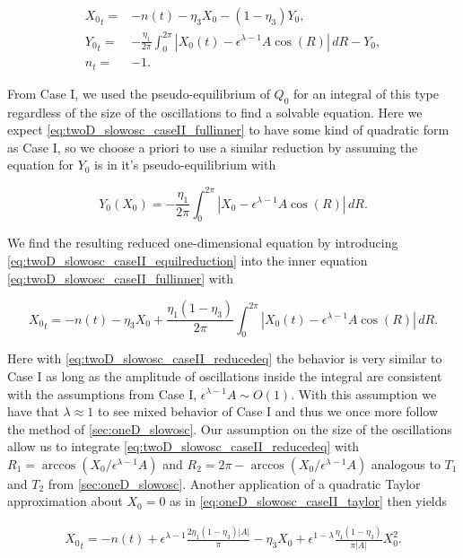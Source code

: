 \begin{equation}\label{eq:twoD_slowosc_caseII_fullinner}
\begin{aligned}
{X_0}_t =& -n(t) -\eta_3 X_0- (1-\eta_3)Y_0,\\
{Y_0}_t =& -\frac{\eta_1}{2\pi}\int_0^{2\pi}|X_0(t)-\epsilon^{\lambda-1}A\cos(R)|\,dR -Y_0,\\
n_t=& -1.
\end{aligned}
\end{equation}

From Case I, we used the pseudo-equilibrium of $Q_0$ for an integral of this type regardless of the size of the oscillations to find a solvable equation. Here we expect \eqref{eq:twoD_slowosc_caseII_fullinner} to have some kind of quadratic form as Case I, so we choose a priori to use a similar reduction by assuming the equation for $Y_0$ is in it's pseudo-equilibrium with

\begin{equation}\label{eq:twoD_slowosc_caseII_equilreduction}
{Y_0}(X_0)= -\frac{\eta_1}{2\pi}\int_0^{2\pi}|X_0-\epsilon^{\lambda-1}A\cos(R)|\,dR.
\end{equation}

We find the resulting reduced one-dimensional equation by introducing \eqref{eq:twoD_slowosc_caseII_equilreduction} into the inner equation \eqref{eq:twoD_slowosc_caseII_fullinner} with

\begin{equation}\label{eq:twoD_slowosc_caseII_reducedeq}
{X_0}_t = -n(t)-\eta_3 X_0+\frac{\eta_1(1-\eta_3)}{2\pi}\int_0^{2\pi}|X_0(t)-\epsilon^{\lambda-1}A\cos(R)|\,dR.
\end{equation}

Here with \eqref{eq:twoD_slowosc_caseII_reducedeq} the behavior is very similar to Case I as long as the amplitude of oscillations inside the integral are consistent with the assumptions from Case I, $\epsilon^{\lambda-1}A \sim O(1)$. With this assumption we have that $\lambda \approx 1$ to see mixed behavior of Case I and thus we once more follow the method of \autoref{sec:oneD_slowosc}. Our assumption on the size of the oscillations allow us to integrate \eqref{eq:twoD_slowosc_caseII_reducedeq} with $R_1= \arccos(X_0/\epsilon^{\lambda-1}A)$ and $R_2 = 2\pi - \arccos(X_0/\epsilon^{\lambda-1}A)$ analogous to $T_1$ and $T_2$ from \autoref{sec:oneD_slowosc}. Another application of a quadratic Taylor approximation about $X_0=0$ as in \eqref{eq:oneD_slowosc_caseII_taylor} then yields

\begin{equation}\label{eq:twoD_slowosc_caseII_taylor}
\begin{aligned}
{X_0}_t = -n(t) +\epsilon^{\lambda-1}\frac{2\eta_1(1-\eta_3)|A|}{\pi}-\eta_3 X_0 +\epsilon^{1-\lambda}\frac{\eta_1(1-\eta_3)}{\pi |A|}X_0^2.
\end{aligned}
\end{equation}

